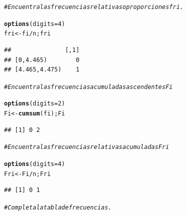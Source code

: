 \documentclass[12pt,letterpaper]{article}\usepackage[]{graphicx}\usepackage[]{color}
\makeatletter
\newcommand{\hlnum}[1]{\textcolor[rgb]{0.686,0.059,0.569}{#1}}%
\newcommand{\hlcom}[1]{\textcolor[rgb]{0.678,0.584,0.686}{\textit{#1}}}%
\newcommand{\hlopt}[1]{\textcolor[rgb]{0,0,0}{#1}}%
\newcommand{\hlstd}[1]{\textcolor[rgb]{0.345,0.345,0.345}{#1}}%
\newcommand{\hlkwb}[1]{\textcolor[rgb]{0.69,0.353,0.396}{#1}}%
\newcommand{\hlkwc}[1]{\textcolor[rgb]{0.333,0.667,0.333}{#1}}%
\newcommand{\hlkwd}[1]{\textcolor[rgb]{0.737,0.353,0.396}{\textbf{#1}}}%
\newenvironment{kframe}{%
 \def\at@end@of@kframe{}%
 \ifinner\ifhmode%
  \def\at@end@of@kframe{\end{minipage}}%
  \begin{minipage}{\columnwidth}%
 \fi\fi%
 \def\FrameCommand##1{\hskip\@totalleftmargin \hskip-\fboxsep
 \colorbox{shadecolor}{##1}\hskip-\fboxsep
     \hskip-\linewidth \hskip-\@totalleftmargin \hskip\columnwidth}%
 \MakeFramed {\advance\hsize-\width
   \@totalleftmargin\z@ \linewidth\hsize
   \@setminipage}}%
 {\par\unskip\endMakeFramed%
 \at@end@of@kframe}
\newenvironment{knitrout}{}{} %
\makeatother
\begin{document}
\begin{enumerate}
\begin{knitrout}
\color{fgcolor}\begin{kframe}
\begin{alltt}
\hlcom{# Encuentra las frecuencias relativas o proporciones fri.}

\hlkwd{options}\hlstd{(}\hlkwc{digits}\hlstd{=}\hlnum{4}\hlstd{)}
\hlstd{fri} \hlkwb{<-} \hlstd{fi}\hlopt{/}\hlstd{n; fri}
\end{alltt}
\begin{verbatim}
##               [,1]
## [0,4.465)        0
## [4.465,4.475)    1
\end{verbatim}
\end{kframe}
\end{knitrout}

\begin{knitrout}
\color{fgcolor}\begin{kframe}
\begin{alltt}
\hlcom{# Encuentra las frecuencias acumuladas ascendentes Fi}

\hlkwd{options}\hlstd{(}\hlkwc{digits}\hlstd{=}\hlnum{2}\hlstd{)}
\hlstd{Fi} \hlkwb{<-} \hlkwd{cumsum}\hlstd{(fi); Fi}
\end{alltt}
\begin{verbatim}
## [1] 0 2
\end{verbatim}
\end{kframe}
\end{knitrout}

\begin{knitrout}
\color{fgcolor}\begin{kframe}
\begin{alltt}
\hlcom{# Encuentra las frecuencias relativas acumuladas Fri}

\hlkwd{options}\hlstd{(}\hlkwc{digits}\hlstd{=}\hlnum{4}\hlstd{)}
\hlstd{Fri} \hlkwb{<-} \hlstd{Fi}\hlopt{/}\hlstd{n; Fri}
\end{alltt}
\begin{verbatim}
## [1] 0 1
\end{verbatim}
\end{kframe}
\end{knitrout}

\begin{knitrout}
\color{fgcolor}\begin{kframe}
\begin{alltt}
\hlcom{# Completa la tabla de frecuencias.}


\end{alltt}
\end{kframe}
\end{knitrout}
\end{enumerate}
\end{document}
